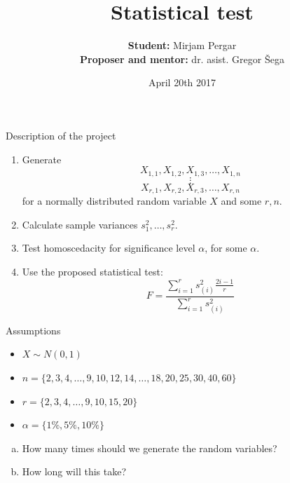 \documentclass{beamer}
\title[Statistical test]
{Statistical test}
\author[Mirjam Pergar]
{\textbf{Student:}  Mirjam Pergar\\
\textbf{Proposer and mentor:} dr. asist. Gregor Šega
}
\institute[Fakuleta za matematiko in fiziko]
\date[April 20th 2017] %
{April 20th 2017}
\begin{document}
\begin{frame}
\titlepage
\end{frame}

\begin{frame}{Description of the project}
\begin{enumerate}
\item Generate 
$$X_{1,1}, X_{1,2},X_{1,3}, \dots , X_{1,n}$$
$$\vdots$$
$$X_{r,1}, X_{r,2}, X_{r,3}, \dots, X_{r,n}$$
for a normally distributed random variable $X$ and some $r, n$.
\item Calculate sample variances $s^2_{1}, \dots, s^2_{r}$.
\item Test homoscedacity for significance level $\alpha$, for some $\alpha$.
\item Use the proposed statistical test: $$F =\frac{ \sum_{i=1}^{r} s^2_{(i)} \frac{2i-1}{r}}{\sum_{i=1}^{r} s^2_{(i)}}$$
\end{enumerate}
\end{frame}

\begin{frame}{Assumptions}
\begin{itemize}
\item $X \sim N(0,1)$
\item $n = \{2,3,4,\dots, 9,10,12,14,\dots, 18,20,25,30,40,60\}$
\item $r = \{2,3,4, \dots ,9,10,15,20\}$
\item $\alpha = \{1\%,5\%,10\%\}$
\end{itemize}
\pause
\begin{enumerate}[(a)]
\item How many times should we generate the random variables?
\item How long will this take?
\end{enumerate}

\end{frame}
\end{document}
